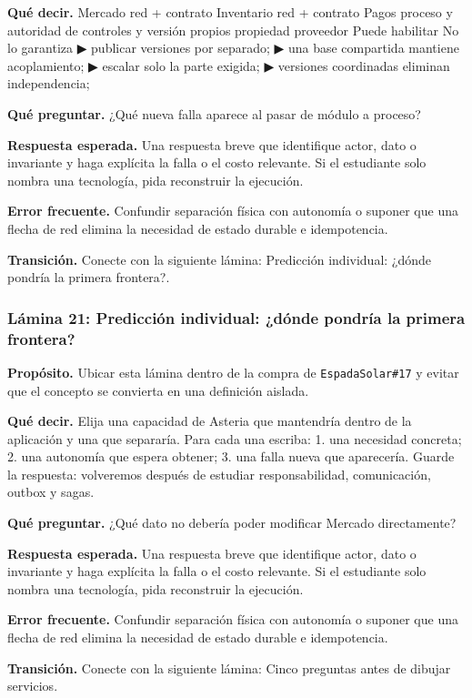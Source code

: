 \documentclass[variant=docente,cover=institutional,mode=screen]{ua-engineering-v6-article}
\begin{document}
\textbf{Qué decir.} Mercado red + contrato Inventario red + contrato Pagos proceso y autoridad de controles y versión propios propiedad proveedor Puede habilitar No lo garantiza ▶ publicar versiones por separado; ▶ una base compartida mantiene acoplamiento; ▶ escalar solo la parte exigida; ▶ versiones coordinadas eliminan independencia;

\textbf{Qué preguntar.} ¿Qué nueva falla aparece al pasar de módulo a proceso?

\textbf{Respuesta esperada.} Una respuesta breve que identifique actor, dato o invariante y haga explícita la falla o el costo relevante. Si el estudiante solo nombra una tecnología, pida reconstruir la ejecución.

\textbf{Error frecuente.} Confundir separación física con autonomía o suponer que una flecha de red elimina la necesidad de estado durable e idempotencia.

\textbf{Transición.} Conecte con la siguiente lámina: Predicción individual: ¿dónde pondría la primera frontera?.

\subsubsection*{Lámina 21: Predicción individual: ¿dónde pondría la primera frontera?}
\textbf{Propósito.} Ubicar esta lámina dentro de la compra de \texttt{EspadaSolar\#17} y evitar que el concepto se convierta en una definición aislada.

\textbf{Qué decir.} Elija una capacidad de Asteria que mantendría dentro de la aplicación y una que separaría. Para cada una escriba: 1. una necesidad concreta; 2. una autonomía que espera obtener; 3. una falla nueva que aparecería. Guarde la respuesta: volveremos después de estudiar responsabilidad, comunicación, outbox y sagas.

\textbf{Qué preguntar.} ¿Qué dato no debería poder modificar Mercado directamente?

\textbf{Respuesta esperada.} Una respuesta breve que identifique actor, dato o invariante y haga explícita la falla o el costo relevante. Si el estudiante solo nombra una tecnología, pida reconstruir la ejecución.

\textbf{Error frecuente.} Confundir separación física con autonomía o suponer que una flecha de red elimina la necesidad de estado durable e idempotencia.

\textbf{Transición.} Conecte con la siguiente lámina: Cinco preguntas antes de dibujar servicios.
\end{document}
